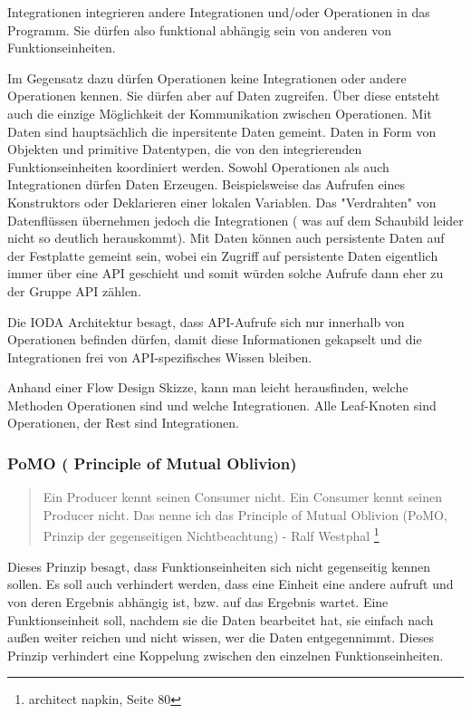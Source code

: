 Integrationen integrieren andere Integrationen und/oder Operationen in das Programm. Sie dürfen also funktional abhängig sein
von anderen von Funktionseinheiten.

Im Gegensatz dazu dürfen Operationen keine Integrationen oder andere Operationen
kennen. Sie dürfen aber auf Daten zugreifen. Über diese entsteht auch die einzige Möglichkeit der
Kommunikation zwischen Operationen. Mit Daten sind hauptsächlich die inpersitente
Daten gemeint. Daten in Form von Objekten und primitive Datentypen, die von den
integrierenden Funktionseinheiten koordiniert werden.
Sowohl Operationen als auch Integrationen dürfen Daten Erzeugen.
Beispielsweise das Aufrufen eines Konstruktors oder Deklarieren einer lokalen Variablen.
Das "Verdrahten" von Datenflüssen übernehmen jedoch die Integrationen ( was auf
dem Schaubild leider nicht so deutlich herauskommt). 
Mit Daten können auch persistente Daten auf der Festplatte gemeint sein, wobei
ein Zugriff auf persistente Daten eigentlich immer über eine API geschieht und
somit würden solche Aufrufe dann eher zu der Gruppe API zählen.

Die IODA Architektur besagt, dass API-Aufrufe sich nur innerhalb von Operationen befinden
dürfen, damit diese Informationen gekapselt und die Integrationen frei von API-spezifisches Wissen bleiben.


Anhand einer Flow Design Skizze, kann man leicht herausfinden, welche Methoden Operationen sind und welche
Integrationen. Alle Leaf-Knoten sind Operationen, der Rest sind Integrationen.


\subsubsection{PoMO ( Principle of Mutual Oblivion)}

\begin{quote}
Ein Producer kennt seinen Consumer nicht. Ein Consumer kennt seinen Producer
nicht. Das nenne ich das Principle of Mutual Oblivion (PoMO,
Prinzip der gegenseitigen Nichtbeachtung) - Ralf Westphal 
\footnote{architect napkin, Seite 80}
\end{quote}

Dieses Prinzip besagt, dass Funktionseinheiten sich nicht gegenseitig kennen sollen.
Es soll auch verhindert werden, dass eine Einheit eine andere aufruft und von deren Ergebnis
abhängig ist, bzw. auf das Ergebnis wartet.
Eine Funktionseinheit soll, nachdem sie die Daten bearbeitet hat, sie einfach nach
außen weiter reichen und nicht wissen, wer die Daten entgegennimmt.
Dieses Prinzip verhindert eine Koppelung zwischen den einzelnen Funktionseinheiten.

